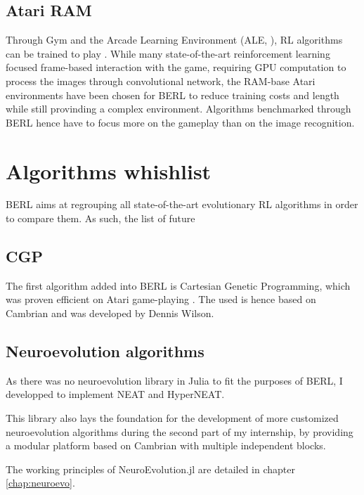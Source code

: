 \subsection{Atari RAM}

Through Gym and the Arcade Learning Environment (ALE, \cite{Atari}), RL algorithms can be trained to play . While many state-of-the-art reinforcement learning focused frame-based interaction with the game, requiring GPU computation to process the images through convolutional network, the RAM-base Atari environments have been chosen for BERL to reduce training costs and length while still provinding a complex environment. Algorithms benchmarked through BERL hence have to focus more on the gameplay than on the image recognition. 

\section{Algorithms whishlist}

BERL aims at regrouping all state-of-the-art evolutionary RL algorithms in order to compare them. As such, the list of future 

\subsection{CGP}

The first algorithm added into BERL is Cartesian Genetic Programming, which was proven efficient on Atari game-playing \cite{CGP}. The  used is hence based on Cambrian and was developed by Dennis Wilson. 

\subsection{Neuroevolution algorithms}

As there was no neuroevolution library in Julia to fit the purposes of BERL, I developped  to implement NEAT and HyperNEAT.

This library also lays the foundation for the development of more customized neuroevolution algorithms during the second part of my internship, by providing a modular platform based on Cambrian with multiple independent blocks. 

The working principles of NeuroEvolution.jl are detailed in chapter \ref{chap:neuroevo}.

